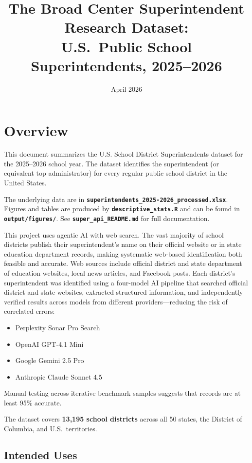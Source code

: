 \documentclass[12pt]{article}
\title{The Broad Center Superintendent Research Dataset:\\U.S.\ Public School Superintendents, 2025--2026}
\date{April 2026}
\begin{document}
\maketitle

\section{Overview}

This document summarizes the U.S. School District Superintendents dataset for the 2025--2026 school year. The dataset identifies the superintendent (or equivalent top administrator) for every regular public school district in the United States.

The underlying data are in \textbf{\texttt{superintendents\_2025-2026\_processed.xlsx}}. Figures and tables are produced by \textbf{\texttt{descriptive\_stats.R}} and can be found in \textbf{\texttt{output/figures/}}. See \textbf{\texttt{super\_api\_README.md}} for full documentation.

This project uses agentic AI with web search. The vast majority of school districts publish their superintendent's name on their official website or in state education department records, making systematic web-based identification both feasible and accurate. Web sources include official district and state department of education websites, local news articles, and Facebook posts. Each district's superintendent was identified using a four-model AI pipeline that searched official district and state websites, extracted structured information, and independently verified results across models from different providers---reducing the risk of correlated errors:
\begin{itemize}
    \item Perplexity Sonar Pro Search
    \item OpenAI GPT-4.1 Mini
    \item Google Gemini 2.5 Pro
    \item Anthropic Claude Sonnet 4.5
\end{itemize}
Manual testing across iterative benchmark samples suggests that records are at least 95\% accurate.

The dataset covers \textbf{13,195 school districts} across all 50 states, the District of Columbia, and U.S.\ territories.

\subsection{Intended Uses}
\end{document}

